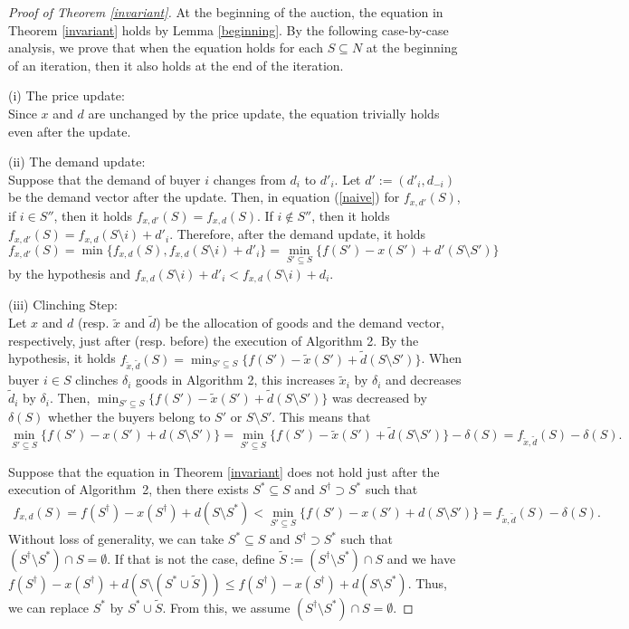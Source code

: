 \documentclass[letterpaper,11pt]{article}
\begin{document}
	\begin{proof}[Proof of Theorem \ref{invariant}]
	At the beginning of the auction, the equation in Theorem \ref{invariant} holds by Lemma \ref{beginning}.
	By the following case-by-case analysis, we prove that 
	when the equation holds for each $S\subseteq N$ 
	at the beginning of an iteration,
	then it also holds at the end of the iteration.
	
	\noindent (i) The price update: \\
	Since $x$ and $d$ are unchanged by the price update, 
	the equation trivially holds even after the update.
	
	\noindent (ii) The demand update:  \\
	Suppose that the demand of buyer $i$ changes from $d_i$ to $d'_i$.
	Let $d':=(d'_i, d_{-i})$ be the demand vector after the update.
	Then, in equation (\ref{naive}) for $f_{x,d'}(S)$, if $i\in S''$, then it holds $f_{x,d'}(S)=f_{x,d}(S)$.
	If $i\notin S''$, then it holds $f_{x,d'}(S)=f_{x,d}(S\setminus i)+d'_i$.
	Therefore, after the demand update, it holds 
	\[
	f_{x,d'}(S)=\min\{f_{x,d}(S),f_{x,d}(S\setminus i)+d'_i\}=
	\min_{S'\subseteq S}\{f(S')-x(S')+d'(S\setminus S')\} 
	\]
	by the hypothesis and 
	$f_{x,d}(S\setminus i)+d'_i<f_{x,d}(S\setminus i)+d_i$.
	
	
	\noindent (iii) Clinching Step: \\
	Let $x$ and $d$ (resp. $\tilde{x}$ and $\tilde{d}$) 
	be the allocation of goods and the demand vector, respectively, 
	just after (resp. before) the execution of Algorithm 2. 
	By the hypothesis, 
	it holds $f_{\tilde{x},\tilde{d}}(S)=\min_{S'\subseteq S}\{f(S')-\tilde{x}(S')+\tilde{d}(S\setminus S')\}$.
	When buyer $i\in S$ clinches $\delta_i$ goods in Algorithm 2,
	this increases $\tilde{x}_i$ by $\delta_i$ and decreases $\tilde{d}_i$ by $\delta_i$.
	Then, $\min_{S'\subseteq S}\{f(S')-\tilde{x}(S')+\tilde{d}(S\setminus S')\}$ 
	was decreased by $\delta(S)$ whether the buyers 
	belong to $S'$ or $S\setminus S'$. 
	This means that
	\[
	\min_{S'\subseteq S}\{f(S')-x(S')+d(S\setminus S')\}=\min_{S'\subseteq S}
	\{f(S')-\tilde{x}(S')+\tilde{d}(S\setminus S')\}-\delta(S)=f_{\tilde{x},\tilde{d}}(S)-\delta(S).
	\] 
	
	Suppose that the equation in Theorem \ref{invariant} 
	does not hold just after the execution of Algorithm~2,
	then there exists $S^*\subseteq S$ and $S^{\dag} \supset S^*$ such that
	\begin{eqnarray}
	\label{X_aft}
	f_{x,d}(S)=f(S^\dag)-x(S^\dag)+d(S\setminus S^*)
	<\min_{S'\subseteq S}\{f(S')-x(S')+d(S\setminus S')\}=f_{\tilde{x},\tilde{d}}(S)-\delta(S).
	\end{eqnarray}
	Without loss of generality, we can take $S^*\subseteq S$ and 
	$S^{\dag} \supset S^*$ such that $(S^\dag\setminus S^*)\cap S=\emptyset$.
	If that is not the case, define $\tilde{S}:=(S^\dag\setminus S^*)\cap S$ and we have
	$f(S^\dag)-x(S^\dag)+d(S\setminus (S^*\cup \tilde{S}))\leq f(S^\dag)-x(S^\dag)+d(S\setminus S^*)$.
	Thus, we can replace $S^{*}$ by $S^*\cup \tilde{S}$. 
	From this, we assume $(S^\dag\setminus S^*)\cap S=\emptyset$.
	

\end{proof}
\end{document}
